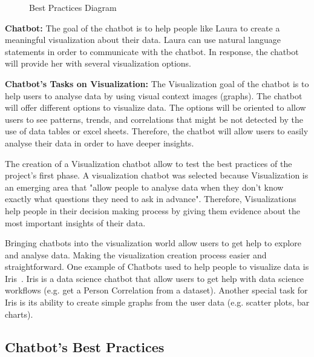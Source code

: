 \documentclass[a4paper,10pt]{article}
\begin{document}
\begin{figure}[p]
    \caption{Best Practices Diagram}
    \label{FigureBestPracticeDiagram}
\end{figure}

\textbf{Chatbot:} The goal of the chatbot is to help people like Laura to create a meaningful visualization about their data. Laura can use natural language statements in order to communicate with the chatbot. In response, the chatbot will provide her with several visualization options.

\textbf{Chatbot's Tasks on Visualization:} The Visualization goal of the chatbot is to help users to analyse data by using visual context images (graphs). The chatbot will offer different options to visualize data. The options will be oriented to allow users to see patterns, trends, and correlations that might be not detected by the use of data tables or excel sheets. Therefore, the chatbot will allow users to easily analyse their data in order to have deeper insights.  

The creation of a Visualization chatbot allow to test the best practices of the project's first phase. A visualization chatbot was selected because Visualization is an emerging area that "allow people to analyse data when they don't know exactly what questions they need to ask in advance"\cite{munzner2014visualization}. Therefore, Visualizations help people in their decision making process by giving them evidence about the most important insights of their data.

Bringing chatbots into the visualization world allow users to get help to explore and analyse data. Making the visualization creation process easier and straightforward.  One example of Chatbots used to help people to visualize data is Iris~\cite{Iris}. Iris is a data science chatbot that allow users to get help with data science workflows (e.g. get a Person Correlation from a dataset). Another special task for Iris is its ability to create simple graphs from the user data (e.g. scatter plots, bar charts).    




\begin{center}
	\section*{Chatbot's Best Practices}
\end{center}
\end{document}
